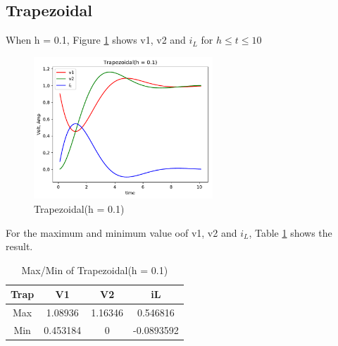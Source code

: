\documentclass{article}
\begin{document}
\subsection{Trapezoidal}
When h = 0.1, Figure \ref{fig:trap 01} shows v1, v2 and $i_L$ for $h \leq t \leq 10$
\begin{figure}[H]
    \centering
    \includegraphics[width=0.6\textwidth]{src/trap_01.pdf}
    \caption{Trapezoidal(h = 0.1)}
    \label{fig:trap 01}
\end{figure}
For the maximum and minimum value oof v1, v2 and $i_L$, Table \ref{tab:trap 01} shows the result.
\begin{table}[htbp]
    \begin{center}
        \begin{tabular}{|c|c|c|c|}
            \hline
            Trap & V1 & V2 & iL \\ \hline
            Max & 1.08936 & 1.16346 & 0.546816 \\ \hline
            Min & 0.453184 & 0 & -0.0893592 \\ \hline
        \end{tabular}
    \end{center}
    \caption{Max/Min of Trapezoidal(h = 0.1)}
    \label{tab:trap 01}
\end{table}
\end{document}
